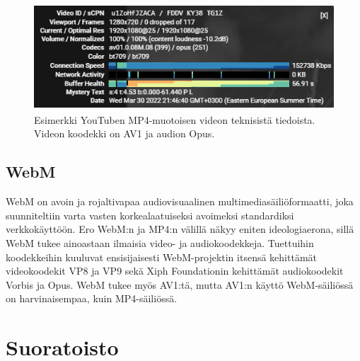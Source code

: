 \documentclass[finnish, 12pt, a4paper, elec, utf8, a-1b, online]{aaltothesis}
\begin{document}
\begin{figure}[htb]
  \centering
  \includegraphics[height=4cm]{./img/youtube.png}
  \caption{Esimerkki YouTuben MP4-muotoisen videon teknisistä tiedoista. Videon koodekki on AV1 ja audion Opus. \label{kuva3}}
\end{figure}

\subsection*{WebM}

WebM on avoin ja rojaltivapaa audiovisuaalinen multimediasäiliöformaatti, joka suunniteltiin varta vasten korkealaatuiseksi avoimeksi standardiksi verkkokäyttöön. \cite{WebM} Ero WebM:n ja MP4:n välillä näkyy eniten ideologiaerona, sillä WebM tukee ainoastaan ilmaisia video- ja audiokoodekkeja. Tuettuihin koodekkeihin kuuluvat ensisijaisesti WebM-projektin itsensä kehittämät videokoodekit VP8 ja VP9 sekä Xiph Foundationin kehittämät audiokoodekit Vorbis ja Opus. WebM tukee myös AV1:tä, mutta AV1:n käyttö WebM-säiliössä on harvinaisempaa, kuin MP4-säiliössä. \\

\clearpage


\section{Suoratoisto}
\end{document}

